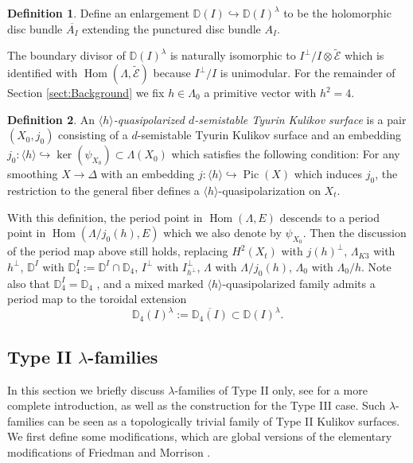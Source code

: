 \documentclass[a4paper]{amsart}
\theoremstyle{definition}
\newtheorem{defn}{Definition}[section]
\theoremstyle{plain}
\theoremstyle{remark}
\newcommand{\D}{\mathbb{D}}
\begin{document}
\begin{defn}
Define an enlargement $\D(I)\hookrightarrow\D(I)^\lambda$ to be the holomorphic disc bundle $\overline{A_I}$ extending the punctured disc bundle $A_I$.
\end{defn}

The boundary divisor of $\D(I)^\lambda$ is naturally isomorphic to $I^\perp/I\otimes \widetilde{\mathcal{E}}$ which is identified with $\operatorname{Hom}(\Lambda,\widetilde{\mathcal{E}})$ because $I^\perp/I$ is unimodular. For the remainder of Section \ref{sect:Background} we fix $h \in \Lambda_0$ a primitive vector with $h^2=4$.

\begin{defn}
An \emph{$\langle h \rangle$-quasipolarized $d$-semistable Tyurin Kulikov surface} is a pair $(X_0,j_0)$ consisting of a $d$-semistable Tyurin Kulikov surface and an embedding $j_0:\langle h \rangle \hookrightarrow \operatorname{ker}(\psi_{X_0})\subset \Lambda(X_0)$ which satisfies the following condition: For any smoothing $X\rightarrow \Delta$ with an embedding $j:\langle h \rangle \hookrightarrow \operatorname{Pic}(X)$ which induces $j_0$, the restriction to the general fiber defines a $\langle h \rangle$-quasipolarization on $X_t$. 
\end{defn}

With this definition, the period point in $\operatorname{Hom}(\Lambda,E)$ descends to a period point in $\operatorname{Hom}(\Lambda/j_0(h), E)$ which we also denote by $\psi_{X_0}$. Then the discussion of the period map above still holds, replacing $H^2(X_t)$ with $j(h)^\perp$, $\Lambda_{K3}$ with $h^\perp$, $\D^I$ with $\D^I_4:=\D^I\cap \D_{4}$, $I^\perp$ with $I^\perp_{h^\perp}$, $\Lambda$ with $\Lambda/j_0(h)$, $\Lambda_0$ with $\Lambda_0/h$. Note also that $\D_4^I=\D_4$ \cite[Proposition 4.17]{AE23}, and a mixed marked $\langle h \rangle$-quasipolarized family admits a period map to the toroidal extension 
$$\D_4(I)^\lambda:=\overline{\D_4(I)}\subset\D(I)^\lambda.$$
\subsection{Type II $\lambda$-families}
In this section we briefly discuss $\lambda$-families of Type II only, see \cite[Section 7]{AE23} for a more complete introduction, as well as the construction for the Type III case. Such $\lambda$-families can be seen as a topologically trivial family of Type II Kulikov surfaces. We first define some modifications, which are global versions of the elementary modifications of Friedman and Morrison \cite{FM81}.
\end{document}
